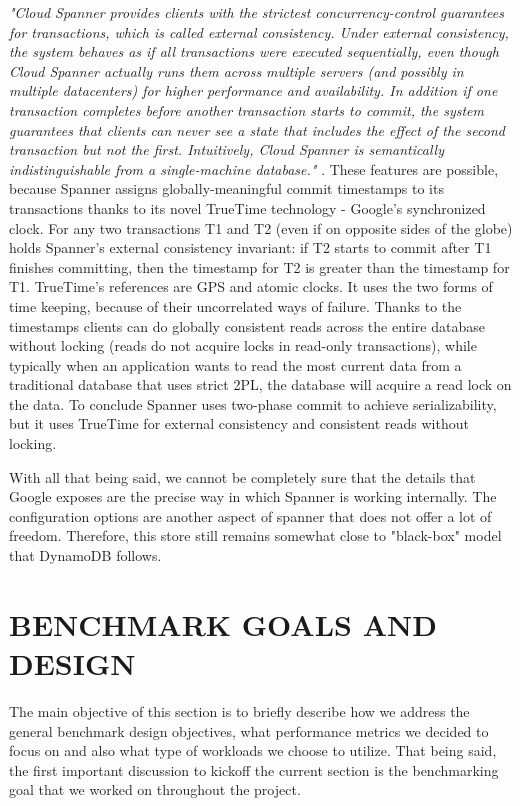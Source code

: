 \documentclass[letterpaper, 10 pt, conference]{ieeeconf}  %
\begin{document}
\textit{"Cloud Spanner provides clients with the strictest concurrency-control guarantees for transactions, which is called external consistency. Under external consistency, the system behaves as if all transactions were executed sequentially, even though Cloud Spanner actually runs them across multiple servers (and possibly in multiple datacenters) for higher performance and availability. In addition if one transaction completes before another transaction starts to commit, the system guarantees that clients can never see a state that includes the effect of the second transaction but not the first. Intuitively, Cloud Spanner is semantically indistinguishable from a single-machine database."} \cite{SpannerWebPage}.
These features are possible, because Spanner assigns globally-meaningful commit timestamps to its transactions thanks to its novel TrueTime technology - Google's synchronized clock. For any two transactions T1 and T2 (even if on opposite sides of the globe) holds Spanner's external consistency invariant: if T2 starts to commit after T1 finishes committing, then the timestamp for T2 is greater than the timestamp for T1. TrueTime's references are GPS and atomic clocks. It uses the two forms of time keeping, because of their uncorrelated ways of failure. Thanks to the timestamps clients can do globally consistent reads across the entire database without locking (reads do not acquire locks in read-only transactions), while typically when an application wants to read the most current data from a traditional database that uses strict 2PL, the database will acquire a read lock on the data. To conclude Spanner uses two-phase commit to achieve serializability, but it uses TrueTime for external consistency and consistent reads without locking. \par
With all that being said, we cannot be completely sure that the details that Google exposes are the precise way in which Spanner is working internally. The configuration options are another aspect of spanner that does not offer a lot of freedom. Therefore, this store still remains somewhat close to "black-box" model that DynamoDB follows.

\section{BENCHMARK GOALS AND DESIGN}
The main objective of this section is to briefly describe how we address the general benchmark design objectives, what performance metrics we decided to focus on and also what type of workloads we choose to utilize. That being said, the first important discussion to kickoff the current section is the benchmarking goal that we worked on throughout the project.  
\end{document}
